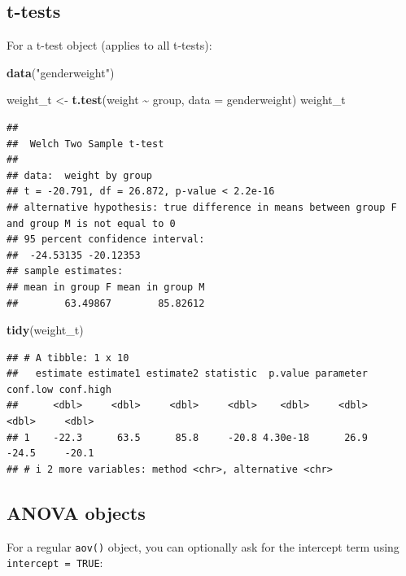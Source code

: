 \documentclass[
]{book}
\newenvironment{Shaded}{\begin{snugshade}}{\end{snugshade}}
\newcommand{\AttributeTok}[1]{\textcolor[rgb]{0.13,0.29,0.53}{#1}}
\newcommand{\FunctionTok}[1]{\textcolor[rgb]{0.13,0.29,0.53}{\textbf{#1}}}
\newcommand{\NormalTok}[1]{#1}
\newcommand{\OtherTok}[1]{\textcolor[rgb]{0.56,0.35,0.01}{#1}}
\newcommand{\SpecialCharTok}[1]{\textcolor[rgb]{0.81,0.36,0.00}{\textbf{#1}}}
\newcommand{\StringTok}[1]{\textcolor[rgb]{0.31,0.60,0.02}{#1}}
\begin{document}
\hypertarget{t-tests-1}{%
\subsection{t-tests}\label{t-tests-1}}

For a t-test object (applies to all t-tests):

\begin{Shaded}
\begin{Highlighting}[]
\FunctionTok{data}\NormalTok{(}\StringTok{"genderweight"}\NormalTok{)}

\NormalTok{weight\_t }\OtherTok{\textless{}{-}} \FunctionTok{t.test}\NormalTok{(weight }\SpecialCharTok{\textasciitilde{}}\NormalTok{ group, }\AttributeTok{data =}\NormalTok{ genderweight)}
\NormalTok{weight\_t}
\end{Highlighting}
\end{Shaded}

\begin{verbatim}
## 
##  Welch Two Sample t-test
## 
## data:  weight by group
## t = -20.791, df = 26.872, p-value < 2.2e-16
## alternative hypothesis: true difference in means between group F and group M is not equal to 0
## 95 percent confidence interval:
##  -24.53135 -20.12353
## sample estimates:
## mean in group F mean in group M 
##        63.49867        85.82612
\end{verbatim}

\begin{Shaded}
\begin{Highlighting}[]
\FunctionTok{tidy}\NormalTok{(weight\_t)}
\end{Highlighting}
\end{Shaded}

\begin{verbatim}
## # A tibble: 1 x 10
##   estimate estimate1 estimate2 statistic  p.value parameter conf.low conf.high
##      <dbl>     <dbl>     <dbl>     <dbl>    <dbl>     <dbl>    <dbl>     <dbl>
## 1    -22.3      63.5      85.8     -20.8 4.30e-18      26.9    -24.5     -20.1
## # i 2 more variables: method <chr>, alternative <chr>
\end{verbatim}

\hypertarget{anova-objects}{%
\subsection{ANOVA objects}\label{anova-objects}}

For a regular \texttt{aov()} object, you can optionally ask for the intercept term using \texttt{intercept\ =\ TRUE}:
\end{document}
